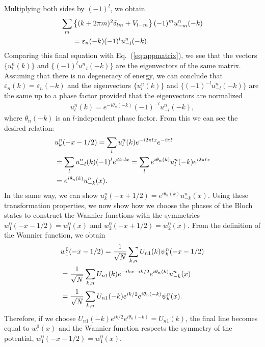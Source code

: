 \documentclass[prb,superscriptaddress,floatfix,twocolumn,showpacs]{revtex4-2}
\begin{document}
Multiplying both sides by $(-1)^l$, we obtain
\begin{align}
    \sum_m &\left\{ (k+2\pi m)^2 \delta_{lm} + V_{l-m} \right\} (-1)^{m} u_{-m}^n(-k) \notag \\
    &= \varepsilon_n(-k) (-1)^{l} u_{-l}^n (-k).
    \label{eq:potential_reflection}
\end{align}
Comparing this final equation with Eq.~(\ref{eq:appmatrix}), we see that the vectors $\{u_l^n(k)\}$ and $\{(-1)^{l} u_{-l}^n (-k)\}$ are the eigenvectors of the same matrix. 
Assuming that there is no degeneracy of energy, we can conclude that $\varepsilon_n (k) = \varepsilon_n (-k)$ and the eigenvectors $\{u_l^n(k)\}$ and $\{(-1)^{-l} u_{-l}^n (-k)\}$ are the same up to a phase factor provided that the eigenvectors are normalized
\begin{align}
    u_l^n(k) = e^{-i\theta_n(-k)}(-1)^{-l} u_{-l}^n (-k),
    \label{eq:fourier-components_reflected}
\end{align}
where $\theta_n(-k)$ is an $l$-independent phase factor. 
From this we can see the desired relation:
\begin{align}
    &u_k^n (-x-1/2) = \sum_l u_l^n(k)e^{-i2\pi l x}e^{-i\pi l}
    \notag \\
    &=
    \sum_l u_{-l}^n(k) (-1)^l e^{i2\pi l x}
    =
    \sum_l e^{i\theta_n(k)} u_l^n(-k) e^{i2\pi l x}
    \notag \\
    &=
    e^{i\theta_n(k)}u_{-k}^n (x).
    \label{eq:eq:uk_plus-minus_derivation}
\end{align}
In the same way, we can show $u_k^n(-x+1/2)=e^{i\theta_n(k)}u_{-k}^n(x)$. 
Using these transformation properties, we now show how we choose the phases of the Bloch states to construct the Wannier functions with the symmetries $w_1^0(-x-1/2) = w_1^0 (x)$ and $w_2^0(-x+1/2) = w_2^0 (x)$. 
From the definition of the Wannier function, we obtain
\begin{align}
    & w_1^0(-x-1/2)
    =
    \frac{1}{\sqrt{N}}\sum_{k,n} U_{n1}(k) \psi_k^n (-x-1/2) \notag \\
    &=
    \frac{1}{\sqrt{N}}\sum_{k,n} U_{n1}(k) e^{-ikx-ik/2}e^{i\theta_n(k)}u_{-k}^n(x)
    \notag \\
    &=
    \frac{1}{\sqrt{N}}\sum_{k,n} U_{n1}(-k) e^{ik/2} e^{i\theta_n(-k)} \psi_k^n (x).
    \label{eq:symmetric_w1}
\end{align}
Therefore, if we choose $U_{n1}(-k) e^{ik/2} e^{i\theta_n(-k)} = U_{n1}(k)$, the final line becomes equal to $w_1^0 (x)$ and the Wannier function respects the symmetry of the potential, $w_1^0(-x-1/2) = w_1^0 (x)$. 
\end{document}
